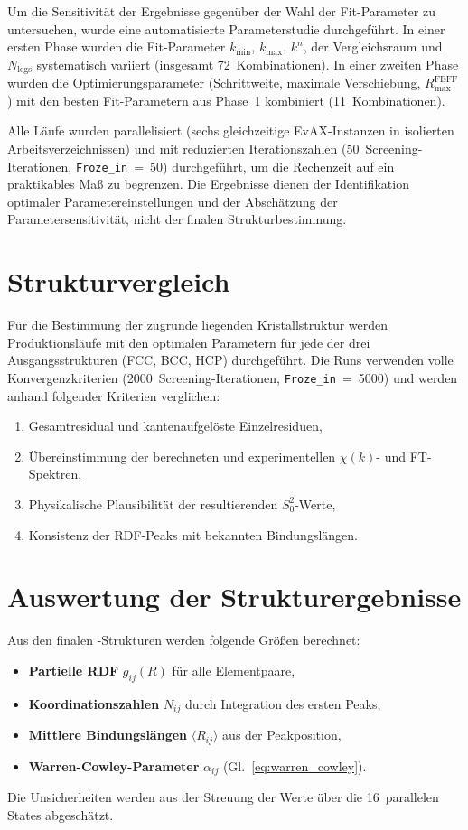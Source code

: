 Um die Sensitivität der Ergebnisse gegenüber der Wahl der
Fit-Parameter zu untersuchen, wurde eine automatisierte
Parameterstudie durchgeführt.
In einer ersten Phase wurden die Fit-Parameter $k_{\min}$,
$k_{\max}$, $k^n$, der Vergleichsraum und $N_{\text{legs}}$
systematisch variiert (insgesamt 72~Kombinationen).
In einer zweiten Phase wurden die Optimierungsparameter
(Schrittweite, maximale Verschiebung, $R_{\max}^{\text{FEFF}}$)
mit den besten Fit-Parametern aus Phase~1 kombiniert
(11~Kombinationen).

Alle Läufe wurden parallelisiert (sechs gleichzeitige EvAX-Instanzen
in isolierten Arbeitsverzeichnissen) und mit reduzierten
Iterationszahlen (50~Screening-Iterationen, \texttt{Froze\_in}~=~50)
durchgeführt, um die Rechenzeit auf ein praktikables Maß zu begrenzen.
Die Ergebnisse dienen der Identifikation optimaler
Parametereinstellungen und der Abschätzung der Parametersensitivität,
nicht der finalen Strukturbestimmung.

\section{Strukturvergleich}
\label{sec:struct-compare}

Für die Bestimmung der zugrunde liegenden Kristallstruktur werden
Produktionsläufe mit den optimalen Parametern für jede der drei
Ausgangsstrukturen (FCC, BCC, HCP) durchgeführt.
Die Runs verwenden volle Konvergenzkriterien
(2000~Screening-Iterationen, \texttt{Froze\_in}~=~5000) und werden
anhand folgender Kriterien verglichen:

\begin{enumerate}[nosep]
  \item Gesamtresidual und kantenaufgelöste Einzelresiduen,
  \item Übereinstimmung der berechneten und experimentellen
        $\chi(k)$- und FT-Spektren,
  \item Physikalische Plausibilität der resultierenden $S_0^2$-Werte,
  \item Konsistenz der RDF-Peaks mit bekannten Bindungslängen.
\end{enumerate}

\section{Auswertung der Strukturergebnisse}

Aus den finalen \evax{}-Strukturen werden folgende Größen berechnet:

\begin{itemize}[nosep]
  \item \textbf{Partielle RDF} $g_{ij}(R)$ für alle Elementpaare,
  \item \textbf{Koordinationszahlen} $N_{ij}$ durch Integration des
        ersten Peaks,
  \item \textbf{Mittlere Bindungslängen} $\langle R_{ij}\rangle$ aus
        der Peakposition,
  \item \textbf{Warren-Cowley-Parameter} $\alpha_{ij}$
        (Gl.~\eqref{eq:warren_cowley}).
\end{itemize}

Die Unsicherheiten werden aus der Streuung der Werte über die
16~parallelen States abgeschätzt.
